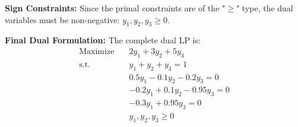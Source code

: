 \documentclass[11pt]{article}
\begin{document}
\textbf{Sign Constraints:}
Since the primal constraints are of the "$\ge$" type, the dual variables must be non-negative: $y_1, y_2, y_3 \ge 0$.

\textbf{Final Dual Formulation:}
The complete dual LP is:
\begin{align*}
		\text{Maximize} \quad & 2y_1 + 3y_2 + 5y_3 \\
		\text{s.t.} \quad & y_1 + y_2 + y_3 = 1 \\
		& 0.5y_1 - 0.1y_2 - 0.2y_3 = 0 \\
		& -0.2y_1 + 0.1y_2 - 0.95y_3 = 0 \\
		& -0.3y_1 + 0.95y_3 = 0 \\
		& y_1, y_2, y_3 \ge 0
\end{align*}
\end{document}
